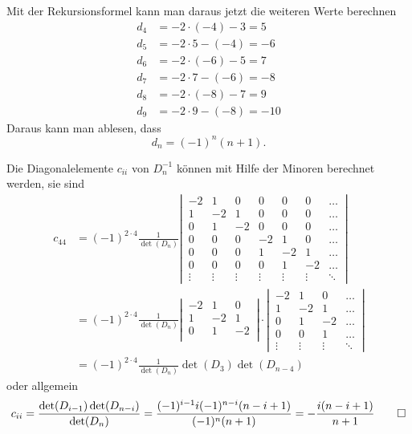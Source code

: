 \begin{loesung}
\begin{teilaufgaben}
Mit der Rekursionsformel kann man daraus jetzt die weiteren Werte berechnen
\begin{align*}
d_4&=-2\cdot(-4) - 3 = 5\\
d_5&=-2\cdot 5 -(-4) = -6\\
d_6&=-2\cdot(-6) - 5 = 7\\
d_7&=-2\cdot 7 -(-6) = -8\\
d_8&=-2\cdot(-8) - 7 = 9\\
d_9&=-2\cdot 9 -(-8) = -10
\end{align*}
Daraus kann man ablesen, dass
\[
d_n=(-1)^n(n+1).
\]
\item
Die Diagonalelemente $c_{ii}$ von $D_n^{-1}$ können mit Hilfe der Minoren berechnet werden,
sie sind
\begin{align*}
c_{44}
&=
(-1)^{2\cdot 4}\frac{1}{\det(D_n)}
\left|\,
\begin{matrix}
-2& 1& 0& 0& 0& 0&\dots\\
 1&-2& 1& 0& 0& 0&\dots\\
 0& 1&-2& 0& 0& 0&\dots\\
 0& 0& 0&-2& 1& 0&\dots\\
 0& 0& 0& 1&-2& 1&\dots\\
 0& 0& 0& 0& 1&-2&\dots\\
\vdots&\vdots&\vdots&\vdots&\vdots&\vdots&\ddots
\end{matrix}
\,\right|
\\
&=
(-1)^{2\cdot 4}\frac{1}{\det(D_n)}
\left|\,
\begin{matrix}
-2& 1& 0\\
 1&-2& 1\\
 0& 1&-2\\
\end{matrix}
\,\right|
\cdot
\left|\,
\begin{matrix}
-2& 1& 0&\dots\\
 1&-2& 1&\dots\\
 0& 1&-2&\dots\\
 0& 0& 1&\dots\\
\vdots&\vdots&\vdots&\ddots
\end{matrix}
\,\right|
\\
&=
(-1)^{2\cdot 4}\frac{1}{\det(D_n)}\det(D_3)\det(D_{n-4})
\end{align*}
oder allgemein
\[
c_{ii}
=\frac{\det(D_{i-1})\det(D_{n-i})}{\det(D_n)}
=\frac{(-1)^{i-1}i(-1)^{n-i}(n-i+1)}{(-1)^n(n+1)}
=-\frac{i(n-i+1)}{n+1}
\qedhere
\]
\end{teilaufgaben}
\end{loesung}

